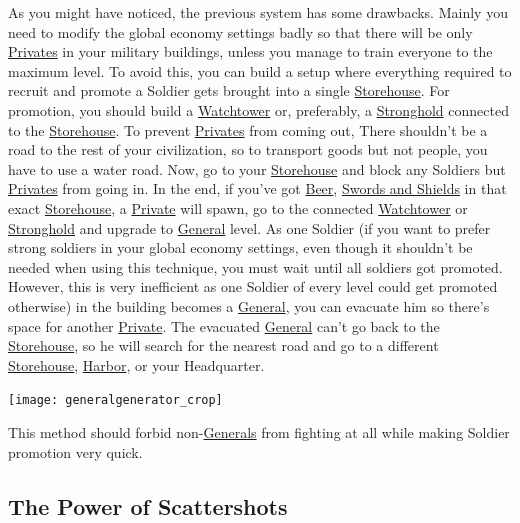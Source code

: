 \documentclass[12pt]{article}
\begin{document}
As you might have noticed, the previous system has some drawbacks. Mainly you need to modify the global economy settings badly so that there will be only \hyperref[sec:private]{Privates} in your military buildings, unless you manage to train everyone to the maximum level. To avoid this, you can build a setup where everything required to recruit and promote a Soldier gets brought into a single \hyperref[sec:storehouse]{Storehouse}. For promotion, you should build a \hyperref[sec:watchtower]{Watchtower} or, preferably, a \hyperref[sec:stronghold]{Stronghold} connected to the \hyperref[sec:storehouse]{Storehouse}. To prevent \hyperref[sec:private]{Privates} from coming out, There shouldn't be a road to the rest of your civilization, so to transport goods but not people, you have to use a water road. Now, go to your \hyperref[sec:storehouse]{Storehouse} and block any Soldiers but \hyperref[sec:private]{Privates} from going in.
\vspace{12pt}
In the end, if you've got \hyperref[sec:brewery]{Beer}, \hyperref[sec:smithy]{Swords and Shields} in that exact \hyperref[sec:storehouse]{Storehouse}, a \hyperref[sec:private]{Private} will spawn, go to the connected \hyperref[sec:watchtower]{Watchtower} or \hyperref[sec:stronghold]{Stronghold} and upgrade to \hyperref[sec:general]{General} level. As one Soldier (if you want to prefer strong soldiers in your global economy settings, even though it shouldn't be needed when using this technique, you must wait until all soldiers got promoted. However, this is very inefficient as one Soldier of every level could get promoted otherwise) in the building becomes a \hyperref[sec:general]{General}, you can evacuate him so there's space for another \hyperref[sec:private]{Private}. The evacuated \hyperref[sec:general]{General} can't go back to the \hyperref[sec:storehouse]{Storehouse}, so he will search for the nearest road and go to a different \hyperref[sec:storehouse]{Storehouse}, \hyperref[sec:harbor]{Harbor}, or your Headquarter.

\vspace{0.5cm}
\texttt{[image: generalgenerator\_crop]}
\vspace{0.5cm}

This method should forbid non-\hyperref[sec:general]{Generals} from fighting at all while making Soldier promotion very quick.

\subsection{The Power of Scattershots}
\label{sec:powerofscattershots}
\end{document}
